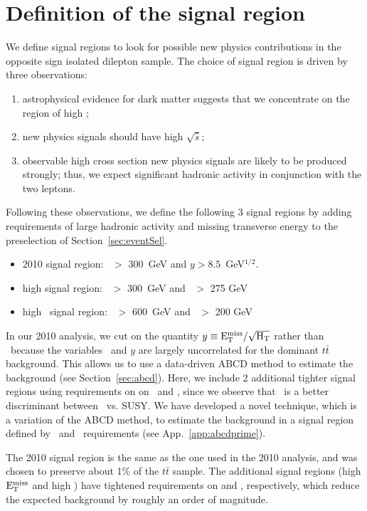 \section{Definition of the signal region}
\label{sec:sigregion}

We define signal regions to look for possible
new physics contributions in the opposite sign isolated 
dilepton sample. The choice of signal region is driven by 
three observations:
\begin{enumerate}
\item astrophysical evidence for dark matter suggests that
we concentrate on the region of high \met;
\item new physics signals should have high $\sqrt{\hat{s}}$;
\item observable high cross section new physics signals 
are likely to be produced strongly;  thus, we expect significant
hadronic activity in conjunction with the two leptons.
\end{enumerate}

Following these observations, we define the following 3 signal regions by 
adding requirements of large hadronic activity and missing transverse energy 
to the preselection of Section~\ref{sec:eventSel}. 
\begin{itemize}
\item 2010 signal region:       \Ht\ $>$ 300~GeV and $y > 8.5$~GeV$^{1/2}$.
\item high \met  signal region: \Ht\ $>$ 300~GeV and \met\ $>$ 275 GeV
\item high \Ht\  signal region: \Ht\ $>$ 600~GeV and \met\ $>$ 200 GeV
\end{itemize}

In our 2010 analysis, we cut on the quantity $y \equiv \rm E_{T}^{miss}/\sqrt{H_T}$ rather than \met\
because the variables \Ht\ and $y$ are
largely uncorrelated for the dominant $t\bar{t}$ background.  
This allows us to use a data-driven ABCD method to estimate the
background (see Section~\ref{sec:abcd}). Here, we include 2 additional tighter signal
regions using requirements on on \met\ and \Ht, since we observe that \met\ is a better 
discriminant between \ttbar\ vs. SUSY. We have developed a novel technique, which is a 
variation of the ABCD method, to estimate the background in a signal region defined by
\met\ and \Ht\ requirements (see App.~\ref{app:abcdprime}).

The 2010 signal region is the same as the one used in the 2010 analysis, and was
chosen to preserve about 1\% of the $t\bar{t}$ sample.
The additional signal regions (high $\rm E_{T}^{miss}$ and high \Ht) have tightened requirements
on \met and \Ht, respectively, which reduce the expected background by roughly
an order of magnitude.

